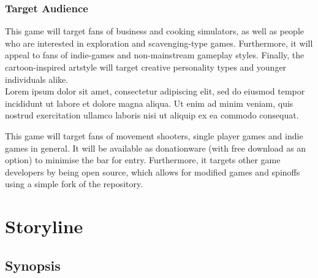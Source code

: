 \documentclass[10pt,a4paper]{article}
\begin{document}
\subsubsection{Target Audience}
This game will target fans of business and cooking simulators, as well as people who are interested in exploration and scavenging-type games. Furthermore, it will appeal to fans of indie-games and non-mainstream gameplay styles. Finally, the cartoon-inspired artstyle will target creative personality types and younger individuals alike. \\
Lorem ipsum dolor sit amet, consectetur adipiscing elit, sed do eiusmod tempor incididunt ut labore et dolore magna aliqua. Ut enim ad minim veniam, quis nostrud exercitation ullamco laboris nisi ut aliquip ex ea commodo consequat.

This game will target fans of movement shooters, single player games and indie games in general. It will be available as donationware (with free download as an option) to minimise the bar for entry. Furthermore, it targets other game developers by being open source, which allows for modified games and spinoffs using a simple fork of the repository. 

\section{Storyline}
\subsection{Synopsis}
\end{document}
